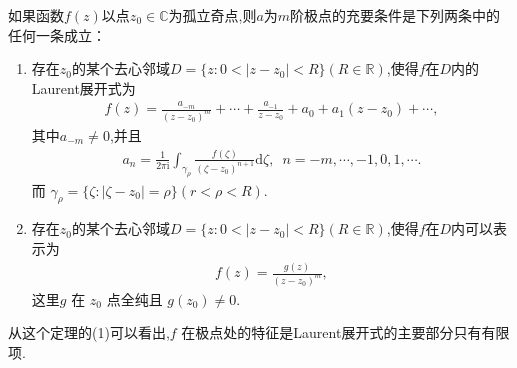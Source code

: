 \documentclass[../../main.tex]{subfiles}%
\begin{document}
\begin{theorem}\label{theorem:m阶极点的充要条件}
如果函数$f(z)$以点$z_0\in \mathbb{C}$为孤立奇点,则$a$为$m$阶极点的充要条件是下列两条中的任何一条成立：
\begin{enumerate}[(1)]
\item\label{theorem:m阶极点的充要条件-1} 存在$z_0$的某个去心邻域$D=\{z:0<|z-z_0|<R\}(R\in \mathbb{R})$,使得\( f \)在$D$内的Laurent展开式为
\begin{align}
f(z) = \frac{a_{-m}}{(z - z_0)^m} + \cdots + \frac{a_{-1}}{z - z_0} + a_0 + a_1(z - z_0) + \cdots, \label{eq---:::213907---2}
\end{align}
其中\( a_{-m} \neq 0 \),并且
\begin{align*}
a_n=\frac{1}{2\pi \mathrm{i}}\int_{\gamma _{\rho}}{\frac{f(\zeta )}{(\zeta -z_0)^{n+1}}\mathrm{d}\zeta},\,\,\,n=-m,\cdots ,-1,0,1,\cdots .
\end{align*}
而 \( \gamma_{\rho} = \{ \zeta: |\zeta - z_0| = \rho \} \)\( (r < \rho < R )\).

\item\label{theorem:m阶极点的充要条件-2} 存在$z_0$的某个去心邻域$D=\{z:0<|z-z_0|<R\}(R\in \mathbb{R})$,使得\( f \)在$D$内可以表示为
\begin{align}\label{eq::0jn2fgj4gfj2-wof8n23}
f(z) = \frac{g(z)}{(z-z_0)^m},
\end{align}
这里\( g \) 在 \( z_0 \) 点全纯且 \( g(z_0) \neq 0 \).
\end{enumerate}
\end{theorem}
\begin{remark}
从这个定理的(1)可以看出,\( f \) 在极点处的特征是Laurent展开式的主要部分只有有限项.
\end{remark}
\end{document}
